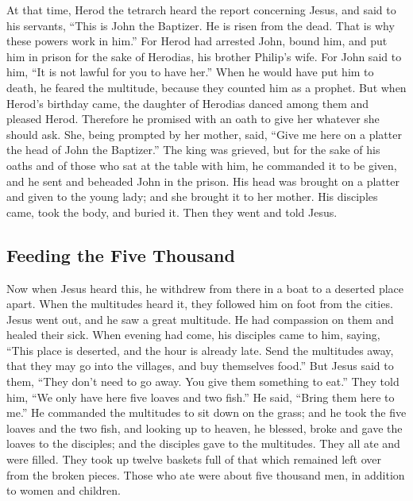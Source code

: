 \begin{paracol}{2}
\begin{otherlanguage}{english}
 At that time, Herod the tetrarch heard the report
concerning Jesus,  and said to his servants, ``This is
John the Baptizer. He is risen from the dead. That is why these powers
work in him.''  For Herod had arrested John, bound him,
and put him in prison for the sake of Herodias, his brother Philip's
wife.  For John said to him, ``It is not lawful for you to
have her.''  When he would have put him to death, he
feared the multitude, because they counted him as a prophet.
 But when Herod's birthday came, the daughter of Herodias
danced among them and pleased Herod.  Therefore he
promised with an oath to give her whatever she should ask.
 She, being prompted by her mother, said, ``Give me here
on a platter the head of John the Baptizer.''  The king
was grieved, but for the sake of his oaths and of those who sat at the
table with him, he commanded it to be given,  and he sent
and beheaded John in the prison.  His head was brought on
a platter and given to the young lady; and she brought it to her mother.
 His disciples came, took the body, and buried it. Then
they went and told Jesus.

\hypertarget{feeding-the-five-thousand}{%
\subsection{Feeding the Five Thousand}\label{feeding-the-five-thousand}}

 Now when Jesus heard this, he withdrew from there in a
boat to a deserted place apart. When the multitudes heard it, they
followed him on foot from the cities.  Jesus went out,
and he saw a great multitude. He had compassion on them and healed their
sick.  When evening had come, his disciples came to him,
saying, ``This place is deserted, and the hour is already late. Send the
multitudes away, that they may go into the villages, and buy themselves
food.''  But Jesus said to them, ``They don't need to go
away. You give them something to eat.''  They told him,
``We only have here five loaves and two fish.''  He said,
``Bring them here to me.''  He commanded the multitudes
to sit down on the grass; and he took the five loaves and the two fish,
and looking up to heaven, he blessed, broke and gave the loaves to the
disciples; and the disciples gave to the multitudes. 
They all ate and were filled. They took up twelve baskets full of that
which remained left over from the broken pieces.  Those
who ate were about five thousand men, in addition to women and children.


\end{otherlanguage}
\end{paracol}
